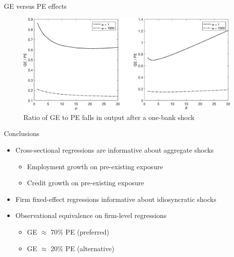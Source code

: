 \documentclass[english,xcolor=svgnames]{beamer}
\begin{document}
\begin{frame}{GE versus PE effects}
\begin{figure}
\includegraphics[scale=0.35]{Figures/ge_to_pe_2_varphi_theta.eps}
\caption*{Ratio of GE to PE falls in output after a one-bank shock}
\end{figure}

\end{frame}

%
%
%		
%		
%
%


\begin{frame}{Conclusions}
\begin{itemize}
\item Cross-sectional regressions are informative about aggregate shocks
\begin{itemize}
\item Employment growth on pre-existing exposure
\item  Credit growth on pre-existing exposure
\end{itemize}
\item Firm fixed-effect regressions informative about idiosyncratic shocks
\item Observational equivalence on firm-level regressions
\begin{itemize}
\item GE $\approx$ 70\% PE  (preferred)
\item GE $\approx$ 20\% PE (alternative)
\end{itemize}
\end{itemize}
\end{frame}
\end{document}
